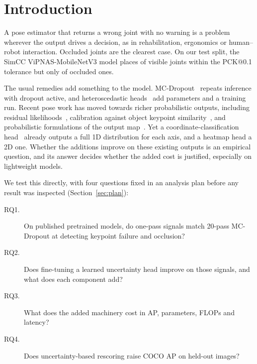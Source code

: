 \documentclass[preprint,11pt]{elsarticle}
\begin{document}
\section{Introduction}

A pose estimator that returns a wrong joint with no warning is a problem wherever the output
drives a decision, as in rehabilitation, ergonomics or human--robot interaction. Occluded joints
are the clearest case. On our test split, the SimCC ViPNAS-MobileNetV3 model places
\pckVis{} of visible joints within the PCK@0.1 tolerance but only \pckOcc{} of occluded ones.

The usual remedies add something to the model. MC-Dropout~\cite{gal2016dropout} repeats
inference with dropout active, and heteroscedastic heads~\cite{kendall2017uncertainties} add
parameters and a training run. Recent pose work has moved towards richer probabilistic outputs,
including residual likelihoods~\cite{li2021rle}, calibration against object keypoint
similarity~\cite{gu2024calibration}, and probabilistic formulations of the output
map~\cite{purkrabek2025probpose}. Yet a coordinate-classification head~\cite{li2022simcc}
already outputs a full 1D distribution for each axis, and a heatmap head a 2D one. Whether the
additions improve on these existing outputs is an empirical question, and its answer decides
whether the added cost is justified, especially on lightweight models.

We test this directly, with four questions fixed in an analysis plan before any result was
inspected (Section~\ref{sec:plan}):
\begin{description}
\item[RQ1.] On published pretrained models, do one-pass signals match 20-pass MC-Dropout at
detecting keypoint failure and occlusion?
\item[RQ2.] Does fine-tuning a learned uncertainty head improve on those signals, and what does
each component add?
\item[RQ3.] What does the added machinery cost in AP, parameters, FLOPs and latency?
\item[RQ4.] Does uncertainty-based rescoring raise COCO AP on held-out images?
\end{description}
\end{document}
